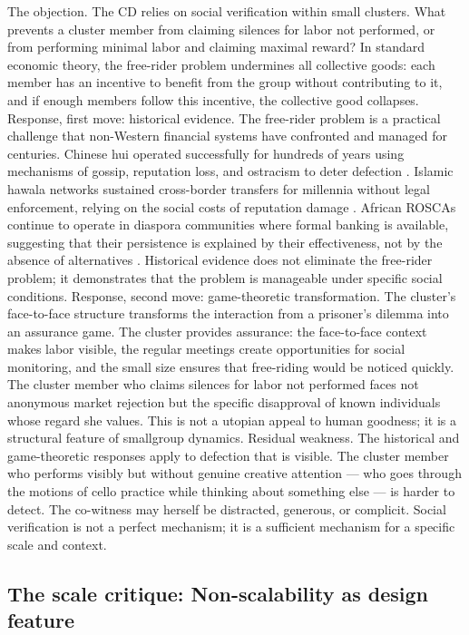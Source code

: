 The objection. The CD relies on social verification within small clusters. What prevents a cluster member from claiming silences for labor not performed, or from performing minimal labor and claiming maximal reward? In standard economic theory, the free-rider problem undermines all collective goods: each member has an incentive to benefit from the group without contributing to it, and if enough members follow this incentive, the collective good collapses. Response, first move: historical evidence. The free-rider problem is a practical challenge that non-Western financial systems have confronted and managed for centuries. Chinese hui operated successfully for hundreds of years using mechanisms of gossip, reputation loss, and ostracism to deter defection \cite{geertz_1962}. Islamic hawala networks sustained cross-border transfers for millennia without legal enforcement, relying on the social costs of reputation damage \cite{ballard_2005}. African ROSCAs continue to operate in diaspora communities where formal banking is available, suggesting that their persistence is explained by their effectiveness, not by the absence of alternatives \cite{ardener_burman_1995}. Historical evidence does not eliminate the free-rider problem; it demonstrates that the problem is manageable under specific social conditions. Response, second move: game-theoretic transformation. The cluster’s face-to-face structure transforms the interaction from a prisoner’s dilemma into an assurance game. The cluster provides assurance: the face-to-face context makes labor visible, the regular meetings create opportunities for social monitoring, and the small size ensures that free-riding would be noticed quickly. The cluster member who claims silences for labor not performed faces not anonymous market rejection but the specific disapproval of known individuals whose regard she values. This is not a utopian appeal to human goodness; it is a structural feature of smallgroup dynamics. Residual weakness. The historical and game-theoretic responses apply to defection that is visible. The cluster member who performs visibly but without genuine creative attention — who goes through the motions of cello practice while thinking about something else — is harder to detect. The co-witness may herself be distracted, generous, or complicit. Social verification is not a perfect mechanism; it is a sufficient mechanism for a specific scale and context.

\subsection{The scale critique: Non-scalability as design feature}

